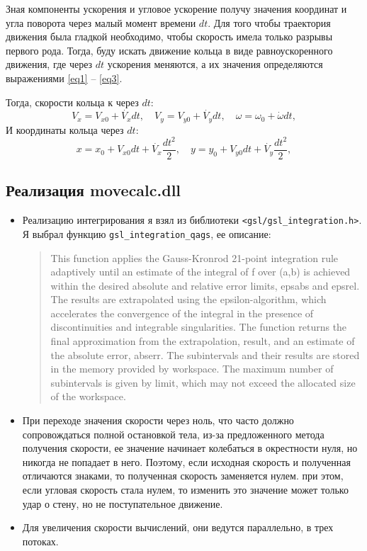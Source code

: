 \documentclass[12pt]{report}
\begin{document}
Зная компоненты ускорения и угловое ускорение получу значения координат и угла поворота через малый момент времени $dt$.
Для того чтобы траектория движения была гладкой необходимо, чтобы скорость имела только разрывы первого рода.
Тогда, буду искать движение кольца в виде равноускоренного движения, где через $dt$ ускорения меняются, а их значения определяются выражениями \ref{eq1} -- \ref{eq3}.

Тогда, скорости кольца к через $dt$:
\begin{equation*}
	V_{x} = V_{x0} + \dot{V_x} dt, \quad V_{y} = V_{y0} + \dot{V_y} dt , \quad \omega = \omega_0 + \dot{\omega} dt,
\end{equation*}
И координаты кольца через $dt$:
\begin{equation*}
	x = x_0 + V_{x0} dt + \dot{V_x} \frac{dt^2}{2}, \quad y = y_0 + V_{y0} dt + \dot{V_y} \frac{dt^2}{2},
\end{equation*}

\subsection*{\centering Реализация movecalc.dll}

\begin{itemize}
\item
	Реализацию интегрирования я взял из библиотеки \verb'<gsl/gsl_integration.h>'.
	Я выбрал функцию \verb'gsl_integration_qags', ее описание:	
\begin{quotation}
This function applies the Gauss-Kronrod 21-point integration rule adaptively until an estimate of the integral of f over (a,b) is achieved within the desired absolute and relative error limits, epsabs and epsrel. The results are extrapolated using the epsilon-algorithm, which accelerates the convergence of the integral in the presence of discontinuities and integrable singularities. The function returns the final approximation from the extrapolation, result, and an estimate of the absolute error, abserr. The subintervals and their results are stored in the memory provided by workspace. The maximum number of subintervals is given by limit, which may not exceed the allocated size of the workspace.
\end{quotation}


\item
	При переходе значения скорости через ноль, что часто должно сопровождаться полной остановкой тела, из-за предложенного метода получения скорости, ее значение начинает колебаться в окрестности нуля, но никогда не попадает в него.
	Поэтому, если исходная скорость и полученная отличаются знаками, то полученная скорость заменяется нулем.
	при этом, если угловая скорость стала нулем, то изменить это значение может только удар о стену, но не поступательное движение.

\item
	Для увеличения скорости вычислений, они ведутся параллельно, в трех потоках.

\end{itemize}
\end{document}
